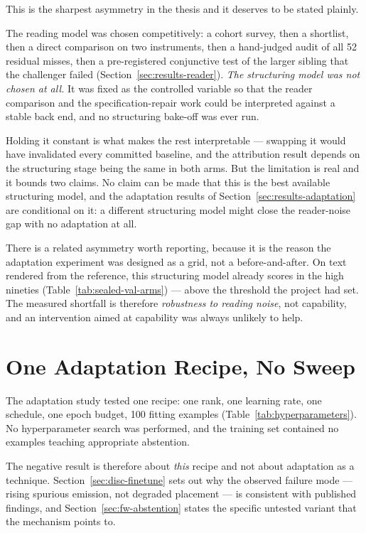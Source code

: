 This is the sharpest asymmetry in the thesis and it deserves to be stated plainly.

The reading model was chosen competitively: a cohort survey, then a shortlist, then a direct
comparison on two instruments, then a hand-judged audit of all 52 residual misses, then a
pre-registered conjunctive test of the larger sibling that the challenger failed
(Section~\ref{sec:results-reader}). \emph{The structuring model was not chosen at all.} It was fixed
as the controlled variable so that the reader comparison and the specification-repair work could
be interpreted against a stable back end, and no structuring bake-off was ever run.

Holding it constant is what makes the rest interpretable --- swapping it would have invalidated
every committed baseline, and the attribution result depends on the structuring stage being the
same in both arms. But the limitation is real and it bounds two claims. No claim can be made that
this is the best available structuring model, and the adaptation results of
Section~\ref{sec:results-adaptation} are conditional on it: a different structuring model might close
the reader-noise gap with no adaptation at all.

There is a related asymmetry worth reporting, because it is the reason the adaptation experiment
was designed as a grid, not a before-and-after. On text rendered from the reference, this
structuring model already scores in the high nineties (Table~\ref{tab:sealed-val-arms}) --- above
the threshold the project had set. The measured shortfall is therefore \emph{robustness to
reading noise}, not capability, and an intervention aimed at capability was always unlikely to
help.

\section{One Adaptation Recipe, No Sweep}
\label{sec:lim-finetune}

The adaptation study tested one recipe: one rank, one learning rate, one schedule, one epoch
budget, 100 fitting examples (Table~\ref{tab:hyperparameters}). No hyperparameter search was
performed, and the training set contained no examples teaching appropriate abstention.

The negative result is therefore about \emph{this} recipe and not about adaptation as a
technique. Section~\ref{sec:disc-finetune} sets out why the observed failure mode --- rising spurious
emission, not degraded placement --- is consistent with published findings, and
Section~\ref{sec:fw-abstention} states the specific untested variant that the mechanism points to.

